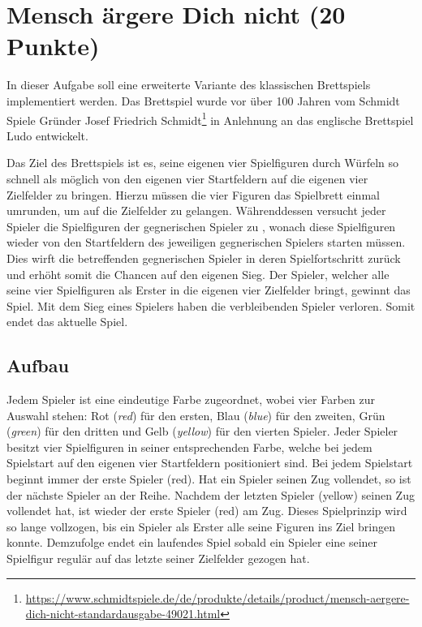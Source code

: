 \documentclass[
  name=\assignment,
  start=\releasedate,
  end=\duedate,
  subject=\lecture\,--\,\semester,
  group=\group,
  url=\theurl,
  author=\authors,
  mail=\themail
]{assignment}
\begin{document}


\section{Mensch ärgere Dich nicht (20 Punkte)}
In dieser Aufgabe soll eine erweiterte Variante des klassischen Brettspiels  implementiert werden. Das Brettspiel wurde vor über 100 Jahren vom Schmidt Spiele Gründer Josef Friedrich Schmidt\footnote{\url{https://www.schmidtspiele.de/de/produkte/details/product/mensch-aergere-dich-nicht-standardausgabe-49021.html}} in Anlehnung an das englische Brettspiel Ludo entwickelt.

Das Ziel des Brettspiels ist es, seine eigenen vier Spielfiguren durch Würfeln so schnell als möglich von den eigenen vier Startfeldern auf die eigenen vier Zielfelder zu bringen. Hierzu müssen die vier Figuren das Spielbrett einmal umrunden, um auf die Zielfelder zu gelangen. Währenddessen versucht jeder Spieler die Spielfiguren der gegnerischen Spieler zu , wonach diese Spielfiguren wieder von den Startfeldern des jeweiligen gegnerischen Spielers starten müssen. Dies wirft die betreffenden gegnerischen Spieler in deren Spielfortschritt zurück und erhöht somit die Chancen auf den eigenen Sieg. Der Spieler, welcher alle seine vier Spielfiguren als Erster in die eigenen vier Zielfelder bringt, gewinnt das Spiel. Mit dem Sieg eines Spielers haben die verbleibenden Spieler verloren. Somit endet das aktuelle Spiel.

\subsection*{Aufbau}
Jedem Spieler ist eine eindeutige Farbe zugeordnet, wobei vier Farben zur Auswahl stehen: Rot (\emph{red}) für den ersten, Blau (\emph{blue}) für den zweiten, Grün (\emph{green}) für den dritten und Gelb (\emph{yellow}) für den vierten Spieler. Jeder Spieler besitzt vier Spielfiguren in seiner entsprechenden Farbe, welche bei jedem Spielstart auf den eigenen vier Startfeldern positioniert sind. Bei jedem Spielstart beginnt immer der erste Spieler (red). Hat ein Spieler seinen Zug vollendet, so ist der nächste Spieler an der Reihe. Nachdem der letzten Spieler (yellow) seinen Zug vollendet hat, ist wieder der erste Spieler (red) am Zug. Dieses Spielprinzip wird so lange vollzogen, bis ein Spieler als Erster alle seine Figuren ins Ziel bringen konnte.
Demzufolge endet ein laufendes Spiel sobald ein Spieler eine seiner Spielfigur regulär auf das letzte seiner Zielfelder gezogen hat.
\end{document}
